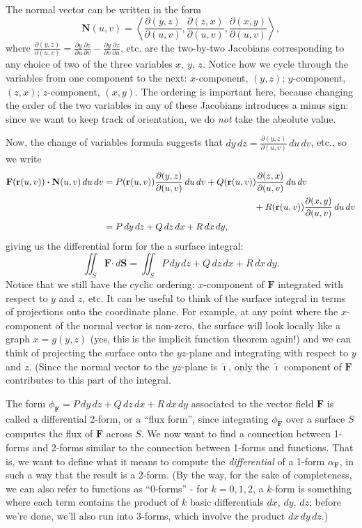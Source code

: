 \documentclass[letterpaper,12pt]{article}
\newcommand{\dotp}{\boldsymbol{\cdot}}
\renewcommand{\r}{\mathbf{r}}
\newcommand{\di}{\displaystyle}
\newcommand{\F}{\mathbf{F}}
\newcommand{\N}{\mathbf{N}}
\newcommand{\pd}[2]{\frac{\partial #1}{\partial #2}}
\begin{document}
The normal vector can be written in the form
\[
\N(u,v) = \left<\frac{\partial(y,z)}{\partial(u,v)},\frac{\partial(z,x)}{\partial (u,v)},\frac{\partial (x,y)}{\partial (u,v)}\right>,
\]
where $\di \pd{(y,z)}{(u,v)} = \pd{y}{u}\pd{z}{v}-\pd{y}{v}\pd{z}{u}$, etc. are the two-by-two Jacobians corresponding to any choice of two of the three variables $x,\,y,\,z$. Notice how we cycle through the variables from one component to the next: $x$-component, $(y,z)$; $y$-component, $(z,x)$; $z$-component, $(x,y)$. The ordering is important here, because changing the order of the two variables in any of these Jacobians introduces a minus sign: since we want to keep track of orientation, we do {\em not} take the absolute value.

Now, the change of variables formula suggests that $\di dy\,dz = \pd{(y,z)}{(u,v)}\,du\,dv$, etc., so we write
\begin{align*}
\F(\r(u,v))\dotp\N(u,v)\,du\,dv &= P(\r(u,v))\pd{(y,z)}{(u,v)}\,du\,dv+Q(\r(u,v))\pd{(z,x)}{(u,v)}\,du\,dv\\ &\hspace{2.3in}+R(\r(u,v))\pd{(x,y)}{(u,v)}\,du\,dv\\
& = P\,dy\,dz+Q\,dz\,dx+R\,dx\,dy,
\end{align*}
giving us the differential form for the a surface integral:
\[
\iint_S\F\dotp\,d\mathbf{S} = \iint_S P\,dy\,dz+Q\,dz\,dx+R\,dx\,dy.
\]
Notice that we still have the cyclic ordering: $x$-component of $\F$ integrated with respect to $y$ and $z$, etc. It can be useful to think of the surface integral in terms of projections onto the coordinate plane. For example, at any point where the $x$-component of the normal vector is non-zero, the surface will look locally like a graph $x=g(y,z)$ (yes, this is the implicit function theorem again!) and we can think of projecting the surface onto the $yz$-plane and integrating with respect to $y$ and $z$. (Since the normal vector to the $yz$-plane is $\hat{\boldsymbol{\imath}}$, only the $\hat{\boldsymbol{\imath}}$ component of $\F$ contributes to this part of the integral. 

The form $\phi_\F = P\,dy\,dz+Q\,dz\,dx+R\,dx\,dy$ associated to the vector field $\F$ is called a differential 2-form, or a ``flux form'', since integrating $\phi_\F$ over a surface $S$ computes the flux of $\F$ across $S$. We now want to find a connection between 1-forms and 2-forms similar to the connection between 1-forms and functions. That is, we want to define what it means to compute the {\em differential} of a 1-form $\alpha_\F$, in such a way that the result is a 2-form. (By the way, for the sake of completeness, we can also refer to functions as ``0-forms'' - for $k=0,1,2$, a $k$-form is something where each term contains the product of $k$ basic differentials $dx,\,dy,\,dz$; before we're done, we'll also run into 3-forms, which involve the product $dx\,dy\,dz$.)
\end{document}
